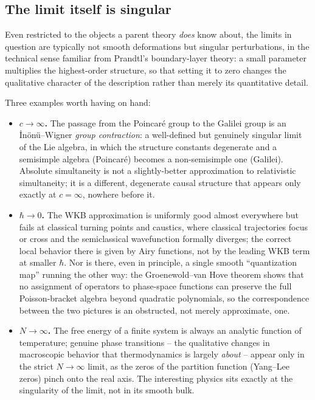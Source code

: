 \subsection{The limit itself is singular}
\label{subsec:singular}

Even restricted to the objects a parent theory \emph{does} know about, the limits in question are typically not smooth deformations but singular perturbations, in the technical sense familiar from Prandtl's boundary-layer theory: a small parameter multiplies the highest-order structure, so that setting it to zero changes the qualitative character of the description rather than merely its quantitative detail.

Three examples worth having on hand:

\begin{itemize}
\item \textbf{$c\to\infty$.} The passage from the Poincar\'e group to the Galilei group is an \.In\"on\"u--Wigner \emph{group contraction}: a well-defined but genuinely singular limit of the Lie algebra, in which the structure constants degenerate and a semisimple algebra (Poincar\'e) becomes a non-semisimple one (Galilei). Absolute simultaneity is not a slightly-better approximation to relativistic simultaneity; it is a different, degenerate causal structure that appears only exactly at $c=\infty$, nowhere before it.
\item \textbf{$\hbar\to0$.} The WKB approximation is uniformly good almost everywhere but fails at classical turning points and caustics, where classical trajectories focus or cross and the semiclassical wavefunction formally diverges; the correct local behavior there is given by Airy functions, not by the leading WKB term at smaller $\hbar$. Nor is there, even in principle, a single smooth ``quantization map'' running the other way: the Groenewold--van Hove theorem shows that no assignment of operators to phase-space functions can preserve the full Poisson-bracket algebra beyond quadratic polynomials, so the correspondence between the two pictures is an obstructed, not merely approximate, one.
\item \textbf{$N\to\infty$.} The free energy of a finite system is always an analytic function of temperature; genuine phase transitions -- the qualitative changes in macroscopic behavior that thermodynamics is largely \emph{about} -- appear only in the strict $N\to\infty$ limit, as the zeros of the partition function (Yang--Lee zeros) pinch onto the real axis. The interesting physics sits exactly at the singularity of the limit, not in its smooth bulk.
\end{itemize}

